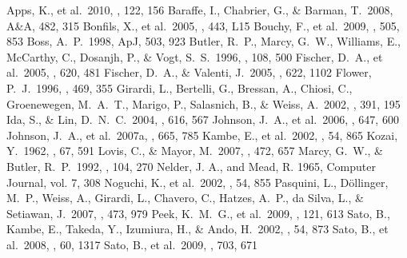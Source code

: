 \documentclass[manuscript]{aastex}
\begin{document}
\begin{thebibliography}{}
 Apps, K., et al.\ 2010, \pasp, 122, 156 
 Baraffe, I., Chabrier, G., \& Barman, T.\ 2008, A\&A, 482, 315 
 Bonfils, X., et al.\ 2005, \aap, 443, L15 
 Bouchy, F., et al.\ 2009, \aap, 505, 853 
 Boss, A.~P.\ 1998, ApJ, 503, 923 
 Butler, R.~P., Marcy, G.~W., Williams, E., McCarthy, C., Dosanjh, P., \& Vogt, S.~S.\ 1996, \pasp, 108, 500
 Fischer, D.~A., et al.\ 2005, \apj, 620, 481 
 Fischer, D.~A., \& Valenti, J.\ 2005, \apj, 622, 1102 
 Flower, P.~J.\ 1996, \apj, 469, 355
 Girardi, L., Bertelli, G., Bressan, A., Chiosi, C., Groenewegen, M.~A.~T., Marigo, P., Salasnich, B., \& Weiss, A.\ 2002, \aap, 391, 195
 Ida, S., \& Lin, D.~N.~C.\ 2004, \apj, 616, 567 
 Johnson, J.~A., et al.\ 2006, \apj, 647, 600 
 Johnson, J.~A., et al.\ 2007a, \apj, 665, 785
 Kambe, E., et al.\ 2002, \pasj, 54, 865
 Kozai, Y.\ 1962, \aj, 67, 591 
 Lovis, C., \& Mayor, M.\ 2007, \aap, 472, 657 
 Marcy, G.~W., \& Butler, R.~P.\ 1992, \pasp, 104, 270 
 Nelder, J. A., and Mead, R. 1965, Computer Journal, vol. 7, 308
 Noguchi, K., et al.\ 2002, \pasj, 54, 855
 Pasquini, L., D{\"o}llinger, M.~P., Weiss, A., Girardi, L., Chavero, C., Hatzes, A.~P., da Silva, L., \& Setiawan, J.\ 2007, \aap, 473, 979 
 Peek, K.~M.~G., et al.\ 2009, \pasp, 121, 613 
 Sato, B., Kambe, E., Takeda, Y., Izumiura, H., \& Ando, H.\ 2002, \pasj, 54, 873 
 Sato, B., et al.\ 2008, \pasj, 60, 1317
 Sato, B., et al.\ 2009, \apj, 703, 671 

\end{thebibliography}
\end{document}
